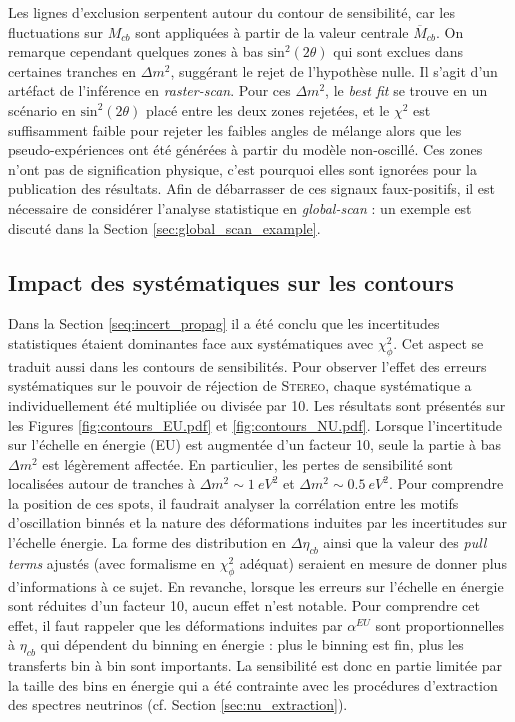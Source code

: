 Les lignes d'exclusion serpentent autour du contour de sensibilité, car les fluctuations sur $M_{cb}$ sont appliquées à partir de la valeur centrale $\overline{M}_{cb}$. On remarque cependant quelques zones à bas $\textrm{sin}^2(2\theta)$ qui sont exclues dans certaines tranches en $\Delta m^2$, suggérant le rejet de l'hypothèse nulle. Il s'agit d'un artéfact de l'inférence en \textit{raster-scan}. Pour ces $\Delta m^2$, le \textit{best fit} se trouve en un scénario en $\textrm{sin}^2(2\theta)$ placé entre les deux zones rejetées, et le $\chi^2$ est suffisamment faible pour rejeter les faibles angles de mélange alors que les pseudo-expériences ont été générées à partir du modèle non-oscillé. Ces zones n'ont pas de signification physique, c'est pourquoi elles sont ignorées pour la publication des résultats. Afin de débarrasser de ces signaux faux-positifs, il est nécessaire de considérer l'analyse statistique en \textit{global-scan} : un exemple est discuté dans la Section \ref{sec:global_scan_example}.


\bigbreak

\subsection{Impact des systématiques sur les contours}

Dans la Section \ref{seq:incert_propag} il a été conclu que les incertitudes statistiques étaient dominantes face aux systématiques avec $\chi^2_\phi$. Cet aspect se traduit aussi dans les contours de sensibilités. Pour observer l'effet des erreurs systématiques sur le pouvoir de réjection de \textsc{Stereo}, chaque systématique a individuellement été multipliée ou divisée par 10. Les résultats sont présentés sur les Figures \ref{fig:contours_EU.pdf} et \ref{fig:contours_NU.pdf}. Lorsque l'incertitude sur l'échelle en énergie (EU) est augmentée d'un facteur 10, seule la partie à bas $\Delta m^2$ est légèrement affectée. En particulier, les pertes de sensibilité sont localisées autour de tranches à $\Delta m^2 \sim \SI{1}{eV^2}$ et  $\Delta m^2 \sim \SI{0.5}{eV^2}$. Pour comprendre la position de ces spots, il faudrait analyser la corrélation entre les motifs d'oscillation binnés et la nature des déformations induites par les incertitudes sur l'échelle énergie. La forme des distribution en $\Delta \eta_{cb}$ ainsi que la valeur des \textit{pull terms} ajustés (avec formalisme en $\chi^2_\phi$ adéquat) seraient en mesure de donner plus d'informations à ce sujet. En revanche, lorsque les erreurs sur l'échelle en énergie sont réduites d'un facteur 10, aucun effet n'est notable. Pour comprendre cet effet, il faut rappeler que les déformations induites par $\alpha^{EU}$ sont proportionnelles à $\eta_{cb}$ qui dépendent du binning en énergie : plus le binning est fin, plus les transferts bin à bin sont importants. La sensibilité est donc en partie limitée par la taille des bins en énergie qui a été contrainte avec les procédures d'extraction des spectres neutrinos (cf. Section \ref{sec:nu_extraction}).\\

